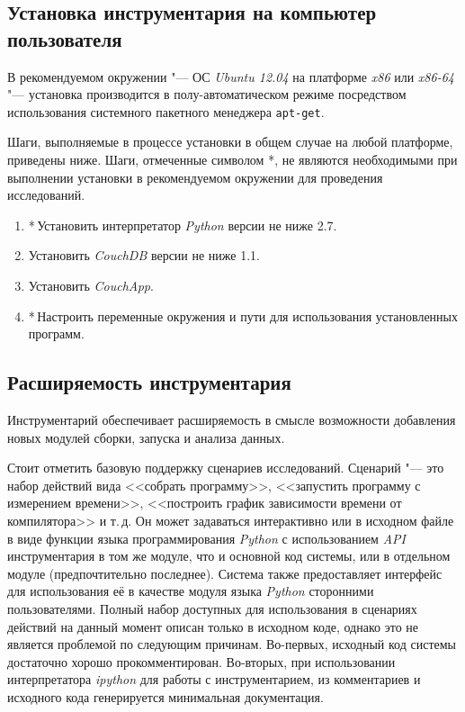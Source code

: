 \subsection{Установка инструментария на компьютер пользователя}
В рекомендуемом окружении "--- ОС \textit{Ubuntu 12.04} на платформе \textit{x86} или \textit{x86-64} "--- установка производится в полу-автоматическом режиме посредством использования системного пакетного менеджера \texttt{apt-get}.

Шаги, выполняемые в процессе установки в общем случае на любой платформе, приведены ниже. Шаги, отмеченные символом {*}, не являются необходимыми при выполнении установки в рекомендуемом окружении для проведения исследований.

\begin{enumerate}
    \item*\,Установить интерпретатор \textit{Python} версии не ниже 2.7.
    \item Установить \textit{CouchDB} версии не ниже 1.1.
    \item Установить \textit{CouchApp}.
    \item*\,Настроить переменные окружения и пути для использования установленных программ.
\end{enumerate}


\subsection{Расширяемость инструментария}
Инструментарий обеспечивает расширяемость в смысле возможности добавления новых модулей сборки, запуска и анализа данных.

Стоит отметить базовую поддержку сценариев исследований. Сценарий "--- это набор действий вида <<собрать программу>>, <<запустить программу с измерением времени>>, <<построить график зависимости времени от компилятора>> и т.\,д. Он может задаваться интерактивно или в исходном файле в виде функции языка программирования \textit{Python} с использованием \textit{API} инструментария в том же модуле, что и основной код системы, или в отдельном модуле (предпочтительно последнее). Система также предоставляет интерфейс для использования её в качестве модуля языка \textit{Python} сторонними пользователями. Полный набор доступных для использования в сценариях действий на данный момент описан только в исходном коде, однако это не является проблемой по следующим причинам. Во-первых, исходный код системы достаточно хорошо прокомментирован. Во-вторых, при использовании интерпретатора \textit{ipython} для работы с инструментарием, из комментариев и исходного кода генерируется минимальная документация.


